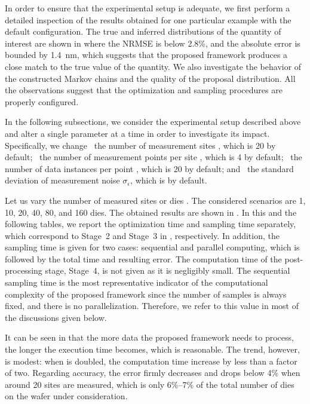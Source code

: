 In order to ensure that the experimental setup is adequate, we first perform a
detailed inspection of the results obtained for one particular example with the
default configuration. The true and inferred distributions of the quantity of
interest are shown in  where the \ac{NRMSE}
is below 2.8\%, and the absolute error is bounded by 1.4~nm, which suggests that
the proposed framework produces a close match to the true value of the quantity.
We also investigate the behavior of the constructed Markov chains and the
quality of the proposal distribution. All the observations suggest that the
optimization and sampling procedures are properly configured.

In the following subsections, we consider the experimental setup described above
and alter a single parameter at a time in order to investigate its impact.
Specifically, we change \one~the number of measurement sites \hnd, which is 20
by default; \two~the number of measurement points per site \np, which is 4 by
default; \three~the number of data instances per point \ns, which is 20 by
default; and \four~the standard deviation of measurement noise
$\sigma_\epsilon$, which is  by default.


Let us vary the number of measured sites or dies \hnd. The considered scenarios
are 1, 10, 20, 40, 80, and 160 dies. The obtained results are shown in
. In this and the following tables, we report the optimization
time and sampling time separately, which correspond to Stage~2 and Stage~3 in
, respectively. In addition, the sampling time is given for
two cases: sequential and parallel computing, which is followed by the total
time and resulting error. The computation time of the post-processing stage,
Stage~4, is not given as it is negligibly small. The sequential sampling time is
the most representative indicator of the computational complexity of the
proposed framework since the number of samples is always fixed, and there is no
parallelization. Therefore, we refer to this value in most of the discussions
given below.

It can be seen in  that the more data the proposed framework
needs to process, the longer the execution time becomes, which is reasonable.
The trend, however, is modest: when \hnd is doubled, the computation time
increase by less than a factor of two. Regarding accuracy, the error firmly
decreases and drops below 4\% when around 20 sites are measured, which is only
6\%--7\% of the total number of dies on the wafer under consideration.

